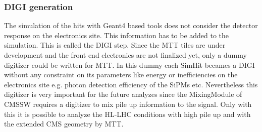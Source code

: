 		\subsubsection{DIGI generation}
			The simulation of the hits with Geant4 based tools does not consider the detector response on the electronics site.
			This information has to be added to the simulation.
			This is called the DIGI step.
			Since the MTT tiles are under development and the front end electronics are not finalized yet, only a dummy digitizer could be written for MTT.
			In this dummy each SimHit becames a DIGI without any constraint on its parameters like energy or inefficiencies on the electronics site e.g. photon detection efficiency of the SiPMs etc.
			Nevertheless this digitizer is very important for the future analyzes since the MixingModule of CMSSW requires a digitizer to mix pile up information to the signal.
			Only with this it is possible to analyze the HL-LHC conditions with high pile up and with the extended CMS geometry by MTT.
